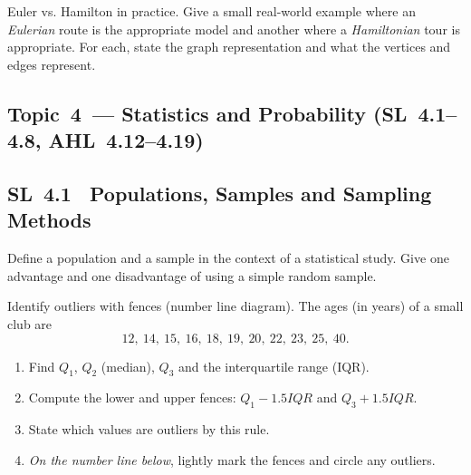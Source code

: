 \documentclass[11pt]{article}
\def\textbf#1{#1}%
\def\mathrm#1{#1}%
\newcommand{\tocsubsection}[1]{\subsection{#1}}
\newcounter{question}
\begin{document}
\begin{question}
\textbf{Euler vs. Hamilton in practice.}
Give a small real-world example where an \emph{Eulerian} route is the appropriate model and another where a \emph{Hamiltonian} tour is appropriate. For each, state the graph representation and what the vertices and edges represent.
\end{question}





\tocsubsection{Topic 4 — Statistics and Probability (SL 4.1–4.8, AHL 4.12–4.19)}

\tocsubsection{SL 4.1 \; Populations, Samples and Sampling Methods}

\begin{question}
Define a population and a sample in the context of a statistical study.  Give
one advantage and one disadvantage of using a simple random sample.
\end{question}



\begin{question}
\textbf{Identify outliers with fences (number line diagram).}
The ages (in years) of a small club are
\[
12,\ 14,\ 15,\ 16,\ 18,\ 19,\ 20,\ 22,\ 23,\ 25,\ 40.
\]
\begin{enumerate}
  \item Find $Q_1$, $Q_2$ (median), $Q_3$ and the interquartile range (IQR).
  \item Compute the lower and upper fences: $Q_1-1.5\mathrm{IQR}$ and $Q_3+1.5\mathrm{IQR}$.
  \item State which values are outliers by this rule.
  \item \emph{On the number line below}, lightly mark the fences and circle any outliers.
\end{enumerate}

\begin{center}
\end{center}
\end{question}
\end{document}
